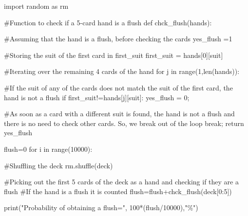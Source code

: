 \documentclass[
  letterpaper,
  DIV=11,
  numbers=noendperiod]{scrreprt}
\newenvironment{Shaded}{\begin{snugshade}}{\end{snugshade}}
\newcommand{\BuiltInTok}[1]{\textcolor[rgb]{0.00,0.23,0.31}{#1}}
\newcommand{\CommentTok}[1]{\textcolor[rgb]{0.37,0.37,0.37}{#1}}
\newcommand{\ControlFlowTok}[1]{\textcolor[rgb]{0.00,0.23,0.31}{#1}}
\newcommand{\DecValTok}[1]{\textcolor[rgb]{0.68,0.00,0.00}{#1}}
\newcommand{\ImportTok}[1]{\textcolor[rgb]{0.00,0.46,0.62}{#1}}
\newcommand{\KeywordTok}[1]{\textcolor[rgb]{0.00,0.23,0.31}{#1}}
\newcommand{\NormalTok}[1]{\textcolor[rgb]{0.00,0.23,0.31}{#1}}
\newcommand{\OperatorTok}[1]{\textcolor[rgb]{0.37,0.37,0.37}{#1}}
\newcommand{\StringTok}[1]{\textcolor[rgb]{0.13,0.47,0.30}{#1}}
\begin{document}
\begin{Shaded}
\begin{Highlighting}[]
\ImportTok{import}\NormalTok{ random }\ImportTok{as}\NormalTok{ rm}

\CommentTok{\#Function to check if a 5{-}card hand is a flush}
\KeywordTok{def}\NormalTok{ chck\_flush(hands):  }
    
    \CommentTok{\#Assuming that the hand is a flush, before checking the cards}
\NormalTok{    yes\_flush }\OperatorTok{=}\DecValTok{1}
    
    \CommentTok{\#Storing the suit of the first card in \textquotesingle{}first\_suit\textquotesingle{}}
\NormalTok{    first\_suit }\OperatorTok{=}\NormalTok{ hands[}\DecValTok{0}\NormalTok{][}\StringTok{\textquotesingle{}suit\textquotesingle{}}\NormalTok{]}
    
    \CommentTok{\#Iterating over the remaining 4 cards of the hand}
    \ControlFlowTok{for}\NormalTok{ j }\KeywordTok{in} \BuiltInTok{range}\NormalTok{(}\DecValTok{1}\NormalTok{,}\BuiltInTok{len}\NormalTok{(hands)):}
        
        \CommentTok{\#If the suit of any of the cards does not match the suit of the first card, the hand is not a flush}
        \ControlFlowTok{if}\NormalTok{ first\_suit}\OperatorTok{!=}\NormalTok{hands[j][}\StringTok{\textquotesingle{}suit\textquotesingle{}}\NormalTok{]:}
\NormalTok{            yes\_flush }\OperatorTok{=} \DecValTok{0}\OperatorTok{;} 
            
            \CommentTok{\#As soon as a card with a different suit is found, the hand is not a flush and there is no need to check other cards. So, we \textquotesingle{}break\textquotesingle{} out of the loop}
            \ControlFlowTok{break}\OperatorTok{;}
    \ControlFlowTok{return}\NormalTok{ yes\_flush}

\NormalTok{flush}\OperatorTok{=}\DecValTok{0}
\ControlFlowTok{for}\NormalTok{ i }\KeywordTok{in} \BuiltInTok{range}\NormalTok{(}\DecValTok{10000}\NormalTok{):}
    
    \CommentTok{\#Shuffling the deck}
\NormalTok{    rm.shuffle(deck)}
    
    \CommentTok{\#Picking out the first 5 cards of the deck as a hand and checking if they are a flush}
    \CommentTok{\#If the hand is a flush it is counted}
\NormalTok{    flush}\OperatorTok{=}\NormalTok{flush}\OperatorTok{+}\NormalTok{chck\_flush(deck[}\DecValTok{0}\NormalTok{:}\DecValTok{5}\NormalTok{])}
    
\BuiltInTok{print}\NormalTok{(}\StringTok{"Probability of obtaining a flush="}\NormalTok{, }\DecValTok{100}\OperatorTok{*}\NormalTok{(flush}\OperatorTok{/}\DecValTok{10000}\NormalTok{),}\StringTok{"\%"}\NormalTok{)}
\end{Highlighting}
\end{Shaded}
\end{document}

